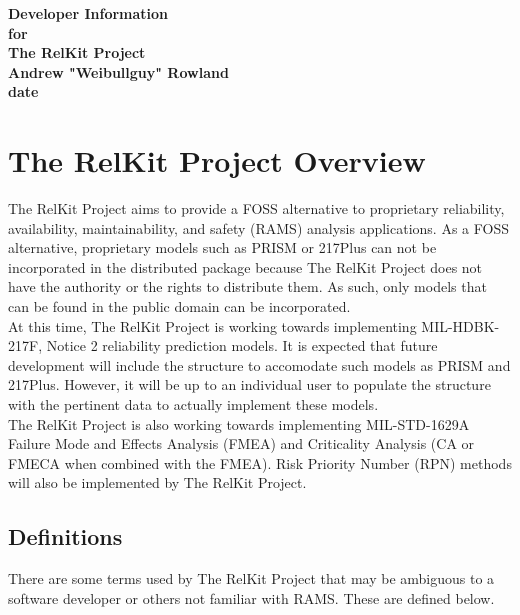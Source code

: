 \documentclass[11pt, 12pt, twoside, onecolumn]{article}
\begin{document}
\begin{titlepage}
\centering
{\Large \bf Developer Information} \\
{\Large \bf for} \\
{\Large \bf The RelKit Project} \\
\bigskip
{\large \bf Andrew "Weibullguy" Rowland} \\
{\Large \bf date}
\end{titlepage}
\linespread{1}

\tableofcontents
\newpage

\section{\bf \Large The RelKit Project Overview}

\noindent The RelKit Project aims to provide a FOSS alternative to proprietary reliability, availability, maintainability, and safety (RAMS) analysis applications.  As a FOSS alternative, proprietary models such as PRISM or 217Plus can not be incorporated in the distributed package because The RelKit Project does not have the authority or the rights to distribute them.  As such, only models that can be found in the public domain can be incorporated. \\

\noindent At this time, The RelKit Project is working towards implementing MIL-HDBK-217F, Notice 2 reliability prediction models.  It is expected that future development will include the structure to accomodate such models as PRISM and 217Plus.  However, it will be up to an individual user to populate the structure with the pertinent data to actually implement these models. \\

\noindent The RelKit Project is also working towards implementing MIL-STD-1629A Failure Mode and Effects Analysis (FMEA) and Criticality Analysis (CA or FMECA when combined with the FMEA).  Risk Priority Number (RPN) methods will also be implemented by The RelKit Project. \\

\subsection{\bf \large Definitions}

\noindent There are some terms used by The RelKit Project that may be ambiguous to a software developer or others not familiar with RAMS.  These are defined below.
\end{document}
